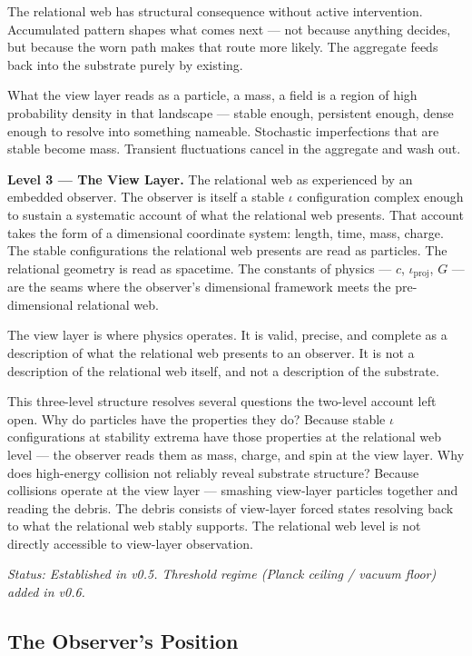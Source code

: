 \documentclass[11pt,letterpaper]{article}
\begin{document}
The relational web has structural consequence without active intervention. Accumulated pattern shapes what comes next --- not because anything decides, but because the worn path makes that route more likely. The aggregate feeds back into the substrate purely by existing.

What the view layer reads as a particle, a mass, a field is a region of high probability density in that landscape --- stable enough, persistent enough, dense enough to resolve into something nameable. Stochastic imperfections that are stable become mass. Transient fluctuations cancel in the aggregate and wash out.

\textbf{Level 3 --- The View Layer.} The relational web as experienced by an embedded observer. The observer is itself a stable \(\iota\) configuration complex enough to sustain a systematic account of what the relational web presents. That account takes the form of a dimensional coordinate system: length, time, mass, charge. The stable configurations the relational web presents are read as particles. The relational geometry is read as spacetime. The constants of physics --- \(c\), \(\iota_{\mathrm{proj}}\), \(G\) --- are the seams where the observer's dimensional framework meets the pre-dimensional relational web.

The view layer is where physics operates. It is valid, precise, and complete as a description of what the relational web presents to an observer. It is not a description of the relational web itself, and not a description of the substrate.

This three-level structure resolves several questions the two-level account left open. Why do particles have the properties they do? Because stable \(\iota\) configurations at stability extrema have those properties at the relational web level --- the observer reads them as mass, charge, and spin at the view layer. Why does high-energy collision not reliably reveal substrate structure? Because collisions operate at the view layer --- smashing view-layer particles together and reading the debris. The debris consists of view-layer forced states resolving back to what the relational web stably supports. The relational web level is not directly accessible to view-layer observation.

\emph{Status: Established in v0.5. Threshold regime (Planck ceiling / vacuum floor) added in v0.6.}

\subsection{The Observer's Position}
\label{sec:org7407a1a}
\end{document}
